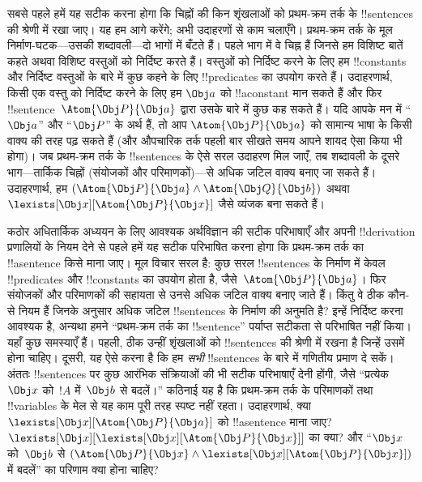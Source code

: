 \documentclass[../../../include/open-logic-section]{subfiles}
\begin{document}


सबसे पहले हमें यह सटीक करना होगा कि चिह्नों की किन शृंखलाओं को प्रथम-क्रम
तर्क के !!{sentence}s की श्रेणी में रखा जाए। यह हम आगे करेंगे; अभी उदाहरणों से काम
चलाएँगे। प्रथम-क्रम तर्क के मूल निर्माण-घटक---उसकी शब्दावली---दो भागों में
बँटते हैं। पहले भाग में वे चिह्न हैं जिनसे हम विशिष्ट बातें कहते अथवा विशिष्ट
वस्तुओं को निर्दिष्ट करते हैं। वस्तुओं को निर्दिष्ट करने के लिए हम
!!{constant}s और निर्दिष्ट वस्तुओं के बारे में कुछ कहने के लिए !!{predicate}s
का उपयोग करते हैं। उदाहरणार्थ, किसी एक वस्तु को निर्दिष्ट करने के लिए हम
  $\Obj a$ को !!a{constant} मान सकते हैं और फिर !!{sentence}~$\Atom{\Obj P}{\Obj
a}$ द्वारा उसके बारे में कुछ कह सकते हैं। यदि आपके मन में ``$\Obj a$'' और
  ``$\Obj P$'' के अर्थ हैं, तो आप $\Atom{\Obj P}{\Obj a}$ को सामान्य
भाषा के किसी वाक्य की तरह पढ़ सकते हैं (और औपचारिक तर्क पहली बार सीखते समय
आपने शायद ऐसा किया भी होगा)। जब प्रथम-क्रम तर्क के !!{sentence}s के ऐसे सरल
उदाहरण मिल जाएँ, तब शब्दावली के दूसरे भाग---तार्किक चिह्नों (संयोजकों और परिमाणकों)---से
  अधिक जटिल वाक्य बनाए जा सकते हैं। उदाहरणार्थ, हम
  $(\Atom{\Obj P}{\Obj a} \land \Atom{\Obj Q}{\Obj b})$
  अथवा~$\lexists[\Obj x][\Atom{\Obj P}{\Obj x}]$ जैसे व्यंजक बना सकते हैं।

कठोर अधितार्किक अध्ययन के लिए आवश्यक अर्थविज्ञान की सटीक परिभाषाएँ और अपनी
!!{derivation} प्रणालियों के नियम देने से पहले हमें यह सटीक परिभाषित करना
होगा कि प्रथम-क्रम तर्क का !!a{sentence} किसे माना जाए। मूल विचार सरल है:
कुछ सरल !!{sentence}s के निर्माण में केवल !!{predicate}s और !!{constant}s का उपयोग होता है,
जैसे~$\Atom{\Obj P}{\Obj a}$। फिर संयोजकों और परिमाणकों की सहायता से उनसे
अधिक जटिल वाक्य बनाए जाते हैं। किंतु वे ठीक कौन-से नियम हैं जिनके अनुसार
अधिक जटिल !!{sentence}s के निर्माण की अनुमति है? इन्हें निर्दिष्ट करना आवश्यक है,
अन्यथा हमने ``प्रथम-क्रम तर्क का !!{sentence}'' पर्याप्त सटीकता से परिभाषित
नहीं किया। यहाँ कुछ समस्याएँ हैं। पहली, ठीक उन्हीं शृंखलाओं को !!{sentence}s
की श्रेणी में रखना है जिन्हें उसमें होना चाहिए। दूसरी, यह ऐसे करना है कि हम \emph{सभी}
!!{sentence}s के बारे में गणितीय प्रमाण दे सकें। अंततः !!{sentence}s पर कुछ
  आरंभिक संक्रियाओं की भी सटीक परिभाषाएँ देनी होंगी, जैसे ``प्रत्येक $\Obj x$
  को~$!A$ में~$\Obj b$ से बदलें।'' कठिनाई यह है कि प्रथम-क्रम तर्क के
परिमाणकों तथा !!{variable}s के मेल से यह काम पूरी तरह स्पष्ट नहीं रहता।
  उदाहरणार्थ, क्या $\lexists[\Obj
x][\Atom{\Obj P}{\Obj a}]$ को !!a{sentence} माना जाए?
  $\lexists[\Obj x][\lexists[\Obj x][\Atom{\Obj P}{\Obj x}]]$ का क्या? और
  ``$\Obj x$ को~$\Obj b$ से $(\Atom{\Obj
P}{\Obj x} \land \lexists[\Obj x][\Atom{\Obj P}{\Obj x}])$ में बदलें'' का
  परिणाम क्या होना चाहिए?
\end{document}
